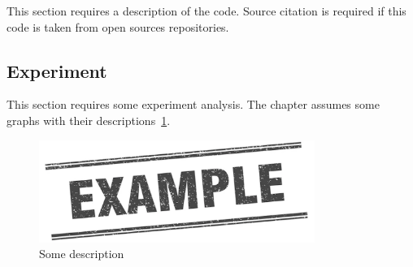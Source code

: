 \documentclass[../../main.tex]{subfiles}
\begin{document}
This section requires a description of the code. Source citation is required if this code is taken from open sources repositories.

\subsection{Experiment}

This section requires some experiment analysis. The chapter assumes some graphs with their descriptions~\ref{fig:example:1}.

\begin{figure}[h!]
\centering
\includegraphics[width=0.8\textwidth]{figures/fig1}
\caption{Some description}
\label{fig:example:1}
\end{figure}
\end{document}
